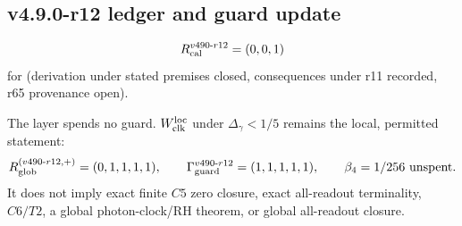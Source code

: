 \subsection*{v4.9.0-r12 ledger and guard update}
\label{subsec:v490-r12-ledger-guard}

\[
R_{\rm cal}^{v490\text{-}r12}=(0,0,1)
\]
for (derivation under stated premises closed, consequences under r11 recorded, r65 provenance open).

The layer spends no guard.  \(W_{\rm clk}^{\rm loc}\) under \(\Delta_\gamma<1/5\) remains the local, permitted statement:
\[
R_{\rm glob}^{(v490\text{-}r12,+)}=(0,1,1,1,1),
\qquad
\Gamma_{\rm guard}^{v490\text{-}r12}=(1,1,1,1,1),
\qquad
\beta_4=1/256\ \text{unspent}.
\]
It does not imply exact finite \(C5\) zero closure, exact all-readout terminality,
\(C6/T2\), a global photon-clock/RH theorem, or global all-readout closure.

